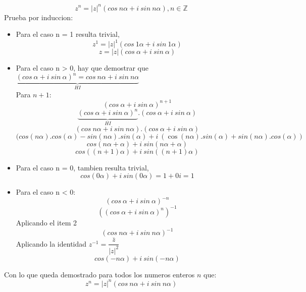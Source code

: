 \documentclass[10pt]{article}
\begin{document}
\newpage
\begin{prf}{}
$$z^n = |z|^n (cos\ n\alpha + i\ sin\ n\alpha), n \in \mathbb{Z}$$
Prueba por induccion:\\
\begin{itemize}

\item Para el caso n = 1 resulta trivial,
$$ z^1 = |z|^1 (cos\ 1\alpha + i\ sin\ 1\alpha) $$
$$ z = |z| (cos\ \alpha + i\ sin\ \alpha)$$

\item Para el caso n > 0, hay que demostrar que $\underbrace{(cos\ \alpha + i\ sin\ \alpha)^n = cos\ n\alpha + i\ sin\ n\alpha}_{HI}$\\
Para $n+1$:
$$ (cos\ \alpha + i\ sin\ \alpha)^{n+1} $$
$$ \underbrace{(cos\ \alpha + i\ sin\ \alpha)^n}_{HI} . (cos\ \alpha + i\ sin\ \alpha) $$
$$ (cos\ n\alpha + i\ sin\ n\alpha) . (cos\ \alpha + i\ sin\ \alpha) $$
$$ (cos(n\alpha).cos(\alpha) - sin(n\alpha).sin(\alpha) + i\ (\cos(n\alpha).sin(\alpha) + sin(n\alpha).cos(\alpha)) $$
$$ cos(n\alpha + \alpha) + i\ sin(n\alpha + \alpha) $$
$$ cos((n + 1)\alpha) + i\ sin((n + 1)\alpha) $$

\item Para el caso n = 0, tambien resulta trivial,
$$ cos(0\alpha) + i\ sin(0\alpha) = 1 + 0i = 1 $$

\item Para el caso n < 0:
$$ (cos\ \alpha + i\ sin\ \alpha)^{-n} $$
$$ \left((cos\ \alpha + i\ sin\ \alpha)^n\right)^{-1} $$
\hfill Aplicando el item 2
$$ (cos\ n\alpha + i\ sin\ n\alpha)^{-1} $$
\hfill Aplicando la identidad $z^{-1} = \dfrac{\overline{z}}{|z|^2}$
$$ cos(-n\alpha) + i\ sin(-n\alpha) $$
\end{itemize}
Con lo que queda demostrado para todos los numeros enteros $n$ que:
$$z^n = |z|^n (cos\ n\alpha + i\ sin\ n\alpha)$$
\end{prf}
\end{document}
